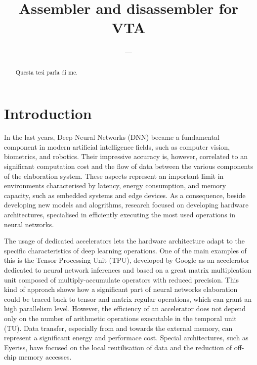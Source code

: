 \documentclass[oneside, binding=0.6cm]{sapthesis}
\title{Assembler and disassembler for VTA}
\author{---}
\begin{document}
	\frontmatter
	\maketitle
	\dedication{Dedicato a\\ me}
	\begin{abstract}
		Questa tesi parla di me.
	\end{abstract}
	\tableofcontents
	
	\printglossary
	
	\mainmatter
	
	\chapter{Introduction}
		
	In the last years, Deep Neural Networks (\gls{DNN}) became a fundamental component in modern artificial intelligence fields, such as computer vision, biometrics, and robotics. Their impressive accuracy is, however, correlated to an significant computation cost and the flow of data between the various components of the elaboration system. These aspects represent an important limit in environments characterised by latency, energy consumption, and memory capacity, such as embedded systems and edge devices.\cite{8114708} As a consequence, beside developing new models and alogrithms, research focused on developing hardware architectures, specialised in efficiently executing the most used operations in neural networks.
	
	The usage of dedicated accelerators lets the hardware architecture adapt to the specific characteristics of deep learning operations. One of the main examples of this is the Tensor Processing Unit (\gls{TPU}), developed by Google as an accelerator dedicated to neural network inferences and based on a great matrix multiplcation unit composed of multiply-accumulate operators with reduced precision.\cite{Jouppi2017} This kind of approach shows how a significant part of neural networks elaboration could be traced back to tensor and matrix regular operations, which can grant an high parallelism level. However, the efficiency of an accelerator does not depend only on the number of arithmetic operations executable in the temporal unit (\gls{TU}). Data transfer, especially from and towards the external memory, can represent a significant energy and performace cost. Special architectures, such as Eyeriss, have focused on the local reutilisation of data and the reduction of off-chip memory accesses.\cite{7738524}
	
\end{document}
